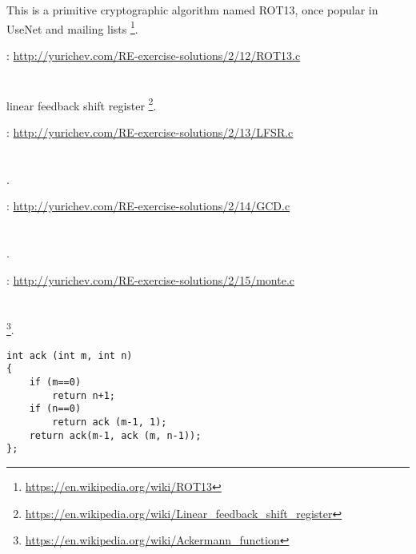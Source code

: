 {This is a primitive cryptographic algorithm named ROT13, once popular in UseNet and mailing lists}
\footnote{\url{https://en.wikipedia.org/wiki/ROT13}}.

\Sourcecode: \url{http://yurichev.com/RE-exercise-solutions/2/12/ROT13.c}

\section{}

linear feedback shift register
\footnote{\url{https://en.wikipedia.org/wiki/Linear_feedback_shift_register}}.

\Sourcecode: \url{http://yurichev.com/RE-exercise-solutions/2/13/LFSR.c}

\section{}

.

\Sourcecode: \url{http://yurichev.com/RE-exercise-solutions/2/14/GCD.c}

\section{}

.

\Sourcecode: \url{http://yurichev.com/RE-exercise-solutions/2/15/monte.c}

\section{}

\footnote{\url{https://en.wikipedia.org/wiki/Ackermann_function}}.

\begin{lstlisting}
int ack (int m, int n)
{
	if (m==0)
		return n+1;
	if (n==0)
		return ack (m-1, 1);
	return ack(m-1, ack (m, n-1));
};
\end{lstlisting}

